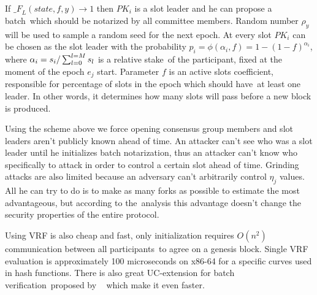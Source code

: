 If ${\mathcal_{F}}_{L}(state, f, y) \rightarrow 1$ then $PK_i$ is a slot leader and he can propose a batch\
which should be notarized by all committee members.
Random number $\rho_y$ will be used to sample a random seed for the next epoch.
At every slot $PK_i$ can be chosen as the slot leader with the probability
${p_i = \phi(\alpha_i, f) = 1-(1-f)^{\alpha_i}}$, where ${\alpha_i=s_i/\\\sum_{l=0}^{l=M} s_l}$ is a relative stake\
of the participant, fixed at the moment of the epoch $e_j$ start.
Parameter $f$ is an active slots coefficient, responsible for percentage of slots in the epoch which should have\
at least one leader.
In other words, it determines how many slots will pass before a new block is produced.

Using the scheme above we force opening consensus group members and slot leaders aren't publicly known ahead of time.
An attacker can't see who was a slot leader until he initializes batch notarization, thus an attacker can't know
who specifically to attack in order to control a certain slot ahead of time.
Grinding attacks are also limited because an adversary can't arbitrarily control $\eta_j$ values.
All he can try to do is to make as many forks as possible to estimate the most advantageous, but according to the\
analysis this advantage doesn't change the security properties of the entire protocol.

Using VRF is also cheap and fast, only initialization requires ${O(n^2)}$ communication between all participants\
to agree on a genesis block.
Single VRF evaluation is approximately 100 microseconds on x86-64 for a specific curves used in hash functions.
There is also great UC-extension for batch verification\
proposed by ~\cite{cryptoeprint:2022/1045} which make it even faster.